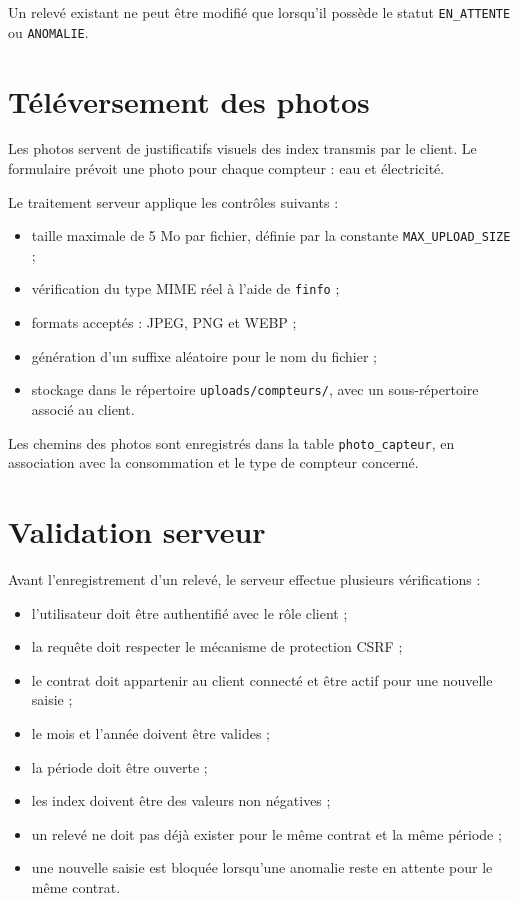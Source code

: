 Un relevé existant ne peut être modifié que lorsqu'il possède le statut \texttt{EN\_ATTENTE} ou \texttt{ANOMALIE}.

\section{Téléversement des photos}

Les photos servent de justificatifs visuels des index transmis par le client. Le formulaire prévoit une photo pour chaque compteur : eau et électricité.

Le traitement serveur applique les contrôles suivants :
\begin{itemize}
    \item taille maximale de 5 Mo par fichier, définie par la constante \texttt{MAX\_UPLOAD\_SIZE} ;
    \item vérification du type MIME réel à l'aide de \texttt{finfo} ;
    \item formats acceptés : JPEG, PNG et WEBP ;
    \item génération d'un suffixe aléatoire pour le nom du fichier ;
    \item stockage dans le répertoire \texttt{uploads/compteurs/}, avec un sous-répertoire associé au client.
\end{itemize}

Les chemins des photos sont enregistrés dans la table \texttt{photo\_capteur}, en association avec la consommation et le type de compteur concerné.

\section{Validation serveur}

Avant l'enregistrement d'un relevé, le serveur effectue plusieurs vérifications :
\begin{itemize}
    \item l'utilisateur doit être authentifié avec le rôle client ;
    \item la requête doit respecter le mécanisme de protection CSRF ;
    \item le contrat doit appartenir au client connecté et être actif pour une nouvelle saisie ;
    \item le mois et l'année doivent être valides ;
    \item la période doit être ouverte ;
    \item les index doivent être des valeurs non négatives ;
    \item un relevé ne doit pas déjà exister pour le même contrat et la même période ;
    \item une nouvelle saisie est bloquée lorsqu'une anomalie reste en attente pour le même contrat.
\end{itemize}

